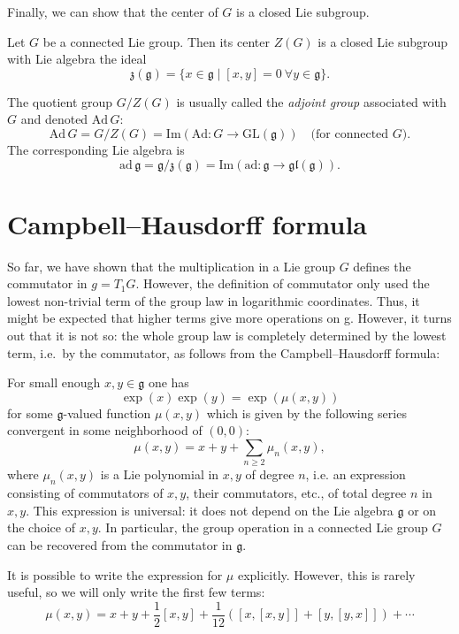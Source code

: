 \documentclass{report}
\begin{document}
Finally, we can show that the center of $G$ is a closed Lie subgroup.


\begin{theorem}
Let $G$ be a connected Lie group. Then its center $Z(G)$ is a closed Lie subgroup with Lie algebra the ideal 
\[
\mathfrak{z}(\mathfrak{g}) = \{ x \in \mathfrak{g} \mid [x, y] = 0 \ \forall y \in \mathfrak{g} \}.
\]
\end{theorem}

The quotient group $G / Z(G)$ is usually called the \textit{adjoint group} associated with $G$ and denoted $\text{Ad}\, G$:
\[
\text{Ad}\, G = G / Z(G) = \text{Im}(\text{Ad}: G \rightarrow \text{GL}(\mathfrak{g})) \quad \text{(for connected } G).
\]
The corresponding Lie algebra is
\[
\text{ad}\, \mathfrak{g} = \mathfrak{g} / \mathfrak{z}(\mathfrak{g}) = \text{Im}(\text{ad}: \mathfrak{g} \rightarrow \mathfrak{gl}(\mathfrak{g})).
\]


\section{Campbell--Hausdorff formula}
So far, we have shown that the multiplication in a Lie group $G$ deﬁnes the
commutator in $g = T_1 G$. 
However, the deﬁnition of commutator only used the lowest non-trivial term of the group law in logarithmic coordinates. Thus, it might be expected that higher terms give more operations on g. However, it turns out that it is not so: the whole group law is completely determined by the lowest term, i.e.\ by the commutator, as follows from the Campbell--Hausdorff formula:
\begin{theorem}
    For small enough $x, y \in \mathfrak{g}$ one has
    \[
    \exp(x) \exp(y) = \exp(\mu(x, y))
    \]
    for some $\mathfrak{g}$-valued function $\mu(x, y)$ which is given by the following series convergent in some neighborhood of $(0, 0)$:
    \[
    \mu(x, y) = x + y + \sum_{n \geq 2} \mu_n(x, y), 
    \]
    where $\mu_n(x, y)$ is a Lie polynomial in $x, y$ of degree $n$, i.e. an expression consisting of commutators of $x, y$, their commutators, etc., of total degree $n$ in $x, y$. This expression is universal: it does not depend on the Lie algebra $\mathfrak{g}$ or on the choice of $x, y$.
    In particular, the group operation in a connected Lie group $G$ can be
    recovered from the commutator in $\mathfrak g$.
    \end{theorem}
    
    It is possible to write the expression for $\mu$ explicitly. 
    However, this is rarely useful, so we will only write the first few terms:
    \[
    \mu(x, y) = x + y + \frac{1}{2}[x, y] + \frac{1}{12} \left( [x, [x, y]] + [y, [y, x]] \right) + \cdots 
    \]
    
\end{document}
